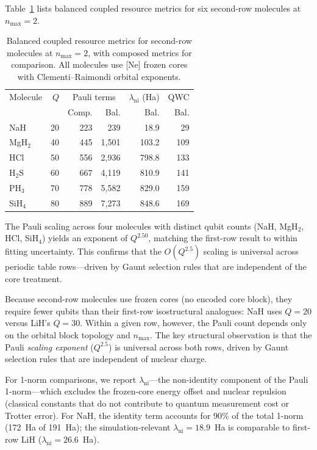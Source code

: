 \documentclass[aps,pra,twocolumn,superscriptaddress,longbibliography]{revtex4-2}
\begin{document}
Table~\ref{tab:second_row} lists balanced coupled resource metrics
for six second-row molecules at $n_{\max} = 2$.

\begin{table}[t]
\caption{Balanced coupled resource metrics for second-row molecules
  at $n_{\max} = 2$, with composed metrics for comparison.
  All molecules use [Ne] frozen cores with Clementi--Raimondi
  orbital exponents.}
\label{tab:second_row}
\begin{ruledtabular}
\begin{tabular}{lrrrrr}
Molecule & $Q$ & \multicolumn{2}{c}{Pauli terms}
  & $\lambda_{\text{ni}}$ (Ha) & QWC \\
  & & Comp. & Bal. & Bal. & Bal. \\
\hline
NaH      &  20 &    223 &    239 &  18.9 &   29 \\
MgH$_2$  &  40 &    445 & 1{,}501 & 103.2 &  109 \\
HCl      &  50 &    556 & 2{,}936 & 798.8 &  133 \\
H$_2$S   &  60 &    667 & 4{,}119 & 810.9 &  141 \\
PH$_3$   &  70 &    778 & 5{,}582 & 829.0 &  159 \\
SiH$_4$  &  80 &    889 & 7{,}273 & 848.6 &  169 \\
\end{tabular}
\end{ruledtabular}
\end{table}

The Pauli scaling across four molecules with distinct qubit counts
(NaH, MgH$_2$, HCl, SiH$_4$) yields an exponent of $Q^{2.50}$,
matching the first-row result to within fitting uncertainty.
This confirms that the $O(Q^{2.5})$ scaling is universal across
periodic table rows---driven by Gaunt selection rules that are
independent of the core treatment.

Because second-row molecules use frozen cores (no encoded core block),
they require fewer qubits than their first-row isostructural
analogues: NaH uses $Q = 20$ versus LiH's $Q = 30$.  Within a
given row, however, the Pauli count depends only on the orbital
block topology and $n_{\max}$.  The key structural observation is
that the Pauli \emph{scaling exponent} ($Q^{2.5}$) is universal
across both rows, driven by Gaunt selection rules that are
independent of nuclear charge.

For 1-norm comparisons, we report
$\lambda_{\text{ni}}$---the non-identity component of the Pauli
1-norm---which excludes the frozen-core energy offset and nuclear
repulsion (classical constants that do not contribute to quantum
measurement cost or Trotter error).  For NaH, the identity term
accounts for 90\% of the total 1-norm (172~Ha of 191~Ha); the
simulation-relevant $\lambda_{\text{ni}} = 18.9$~Ha is comparable
to first-row LiH ($\lambda_{\text{ni}} = 26.6$~Ha).
\end{document}
